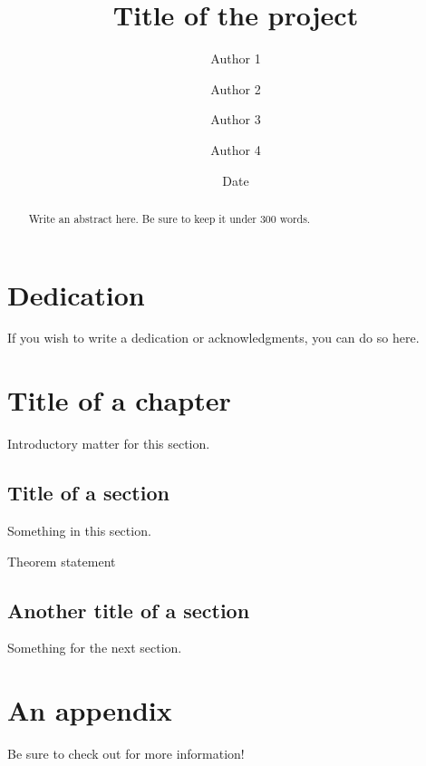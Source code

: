 \documentclass[twoside]{memoir}
\title{Title of the project}
\author{Author 1 \and Author 2 \and Author 3 \and Author 4}
\date{Date}
\begin{document}
\frontmatter

\maketitle

\chapter{Dedication}
If you wish to write a dedication or acknowledgments, you can do so here.

\begin{abstract}
  Write an abstract here.
  Be sure to keep it under 300 words.
\end{abstract}

\tableofcontents


\mainmatter

\chapter{Title of a chapter}
Introductory matter for this section.

\section{Title of a section}
Something in this section.

\begin{theorem}
  Theorem statement
\end{theorem}

\section{Another title of a section}
Something for the next section.

\appendix
\chapter{An appendix}
Be sure to check out \cite{notsoshort} for more information!

\backmatter
\printbibliography
\end{document}

